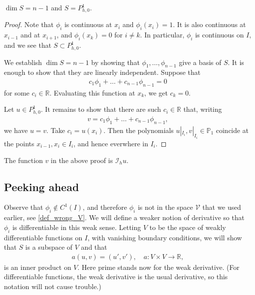 \documentclass[12pt,oneside]{amsart}
\def\R{\mathbb R}
\def\I{\mathcal I}
\begin{document}
\begin{lemma}
$\dim S = n-1$ and $S = P^1_{h,0}$.
\end{lemma}
\begin{proof}
Note that $\phi_i$ is continuous at $x_i$ and $\phi_i(x_i) = 1$.
It is also continuous at $x_{i-1}$ and at $x_{i+1}$,
and $\phi_i(x_k) = 0$ for $i \ne k$. In particular, $\phi_i$ is continuous on $I$, and we see that $S \subset P_{h,0}^1$.

We establish $\dim S = n - 1$ by showing that $\phi_1,\dots,\phi_{n-1}$ give a basis of $S$.
It is enough to show that they are linearly independent.
Suppose that 
    \begin{align*}
c_1 \phi_1 + \dots + c_{n-1} \phi_{n-1} = 0
    \end{align*}
for some $c_i \in \R$. Evaluating this function at $x_k$, we get 
$c_k = 0$.

Let $u \in P^1_{h,0}$. It remains to show that there are such $c_i \in \R$ that, writing
    \begin{align*}
v = c_1 \phi_1 + \dots + c_{n-1} \phi_{n-1},
    \end{align*}
we have $u = v$. 
Take $c_i = u(x_i)$. Then 
the polynomials
$u|_{I_i}, v|_{I_i} \in \mathbb P_1$ 
coincide at the points $x_{i-1}, x_i \in I_i$, and hence everwhere in $I_i$.
\end{proof}

\begin{remark}\label{rem_Ih}
The function $v$ in the above proof is $\I_h u$.
\end{remark}

\subsection{Peeking ahead\label{sec_peek}}

Observe that $\phi_i \notin C^1(I)$, and therefore $\phi_i$ is not in the space $\mathcal V$
that we used earlier, see \eqref{def_wrong_V}. We will define a weaker notion of derivative so that $\phi_i$ is differentiable in this weak sense. Letting $V$ to be the space of weakly differentiable functions on $I$, with vanishing boundary conditions, 
we will show that $S$ is a subspace of $V$ and that 
    \begin{align*}
a(u, v) = (u', v'), \quad a : V \times V \to \mathbb R,
    \end{align*}
is an inner product on $V$. Here prime stands now for the weak derivative. (For differentiable functions, the weak derivative is the usual derivative, so this notation will not cause trouble.)
\end{document}
